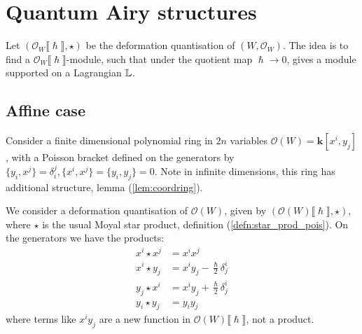     


    \fi 
    
    \section{Quantum Airy structures}
    
    Let \( (\mathcal{O}_W \lBrack \hslash \rBrack ,\star)\) be the deformation quantisation of \( (W,\mathcal{O}_W)\).  The idea is to find a \( \mathcal{O}_W\lBrack \hslash \rBrack\)-module, such that under the quotient map \( \hslash \rightarrow 0\), gives a module supported on a Lagrangian \( \mathbb{L}\).  

    \subsection{Affine case}

    Consider a finite dimensional polynomial ring in \(2n\) variables \( \mathcal{O}(W)= \mathbf{k}[x^i, y_j]\), with a Poisson bracket defined on the generators by \( \{ y_i, x^j \} = \delta_{i}^j, \{ x^i, x^j\} = \{y_i,y_j\} = 0\). Note in infinite dimensions, this ring has additional structure, lemma (\ref{lem:coordring}).
    
    We consider a deformation quantisation of \( \mathcal{O}(W)\), given by  \((\mathcal{O}(W)\lBrack \hslash \rBrack, \star ) \), where \( \star\) is the usual Moyal star product, definition (\ref{defn:star_prod_pois}). On the generators we have the products:
    \begin{align*}
         x^i \star x^j &= x^i x^j \\
         x^i \star y_j &= x^i y_j - \frac{\hslash}{2} \delta_{j}^i\\ 
         y_j \star x^i &= x^i y_j + \frac{\hslash}{2} \delta_{j}^i \\ 
         y_i \star y_j &= y_i y_j
    \end{align*}
    where terms like \(x^i y_j\) are a new function in \(\mathcal{O}(W)\lBrack \hslash \rBrack\), not a product.
    
